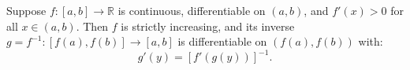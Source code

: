 Suppose $f: [a, b] \to \mathbb{R}$ is continuous, differentiable on $(a, b)$, and $f'(x) > 0$ for all $x \in (a, b)$. Then $f$ is strictly increasing, and its inverse $g = f^{-1}: [f(a), f(b)] \to [a, b]$ is differentiable on $(f(a), f(b))$ with:
\[
g'(y) = \left[f'(g(y))\right]^{-1}.
\]

